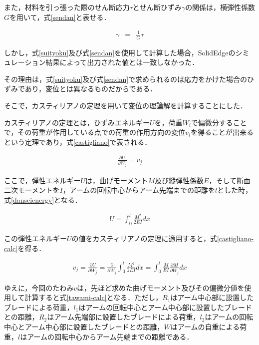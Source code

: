 また，材料を引っ張った際のせん断応力\(\tau\)とせん断ひずみ\(\gamma\)の関係は，横弾性係数\(G\)を用いて，式\ref{sendan}と表せる．

\begin{eqnarray}
  \gamma &=& \frac{1}{G}\tau
  \label{sendan}
\end{eqnarray}

しかし，式\ref{suityoku}及び式\ref{sendan}を使用して計算した場合，SolidEdgeのシミュレーション結果によって出力された値とは一致しなかった．

その理由は，式\ref{suityoku}及び式\ref{sendan}で求められるのは応力をかけた場合のひずみであり，変位とは異なるものだからである．

そこで，カスティリアノの定理を用いて変位の理論解を計算することにした．

カスティリアノの定理とは，ひずみエネルギー\(U\)を，荷重\(W_{i}\)で偏微分することで，その荷重が作用している点での荷重の作用方向の変位\(v_{i}\)を得ることが出来るという定理であり，式\ref{castigliano}で表される．

\begin{eqnarray}
  \frac{\partial U}{\partial W_{j}} = v_{j}
  \label{castigliano}
\end{eqnarray}

ここで，弾性エネルギー\(U\)は，曲げモーメント\(M\)及び縦弾性係数\(E\)，そして断面二次モーメントを\(I\)，アームの回転中心からアーム先端までの距離を\(l\)とした時，式\ref{danseienergy}となる．

\begin{eqnarray}
  U =   \int_0^l \frac{M^2}{2EI} dx  
  \label{danseienergy}
\end{eqnarray}

この弾性エネルギー\(U\)の値をカスティリアノの定理に適用すると，式\ref{castigliano-calc}を得る．

\begin{eqnarray}
  v_{j} = \frac{\partial U}{\partial W_{j}} = \frac{\partial}{\partial W_{j}}\int_0^l \frac{M^2}{2EI} dx = \int_0^l \frac{M}{EI}\frac{\partial M}{\partial W_{j}}dx
  \label{castigliano-calc}
\end{eqnarray}

ゆえに，今回のたわみ\(v\)は，先ほど求めた曲げモーメント及びその偏微分値を使用して計算すると式\ref{tawami-calc}となる．ただし，\(R_1\)はアーム中心部に設置したブレードによる荷重，\(l_1\)はアームの回転中心とアーム中心部に設置したブレードとの距離，\(R_2\)はアーム先端部に設置したブレードによる荷重，\(l_2\)はアームの回転中心とアーム中心部に設置したブレードとの距離，\(W\)はアームの自重による荷重，\(l\)はアームの回転中心からアーム先端までの距離である．

